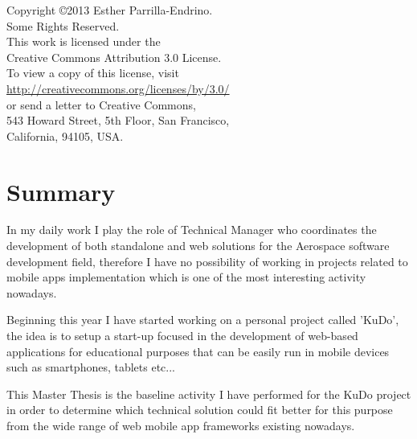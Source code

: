 \documentclass[a4paper,12pt]{book}
\begin{document}
\newpage
\thispagestyle{empty}
\vspace{5cm}
\begin{flushright}
\begin{large}
Copyright \copyright 2013 Esther Parrilla-Endrino.\\
Some Rights Reserved.\\
This work is licensed under the\\
Creative Commons Attribution 3.0 License.\\
To view a copy of this license, visit\\
\url{http://creativecommons.org/licenses/by/3.0/}\\
or send a letter to Creative Commons,\\
543 Howard Street, 5th Floor, San Francisco,\\
California, 94105, USA.\\
\end{large}
\end{flushright}

\newpage

\tableofcontents  %

\renewcommand{\refname}{Bibliography}
\addtolength{\parskip}{\baselineskip}


\chapter*{Summary}
\label{chap:summary}

In my daily work I play the role of Technical Manager who coordinates the development of both standalone and web solutions for the Aerospace software development field, therefore I have no possibility of working in projects related to mobile apps implementation which is one of the most interesting activity nowadays.

Beginning this year I have started working on a personal project called 'KuDo', the idea is to setup a start-up focused in the development of web-based applications for educational purposes that can be easily run in mobile devices such as smartphones, tablets etc...

This Master Thesis is the baseline activity I have performed for the KuDo project in order to determine which technical solution could fit better for this purpose from the wide range of web mobile app frameworks existing nowadays.
\end{document}
